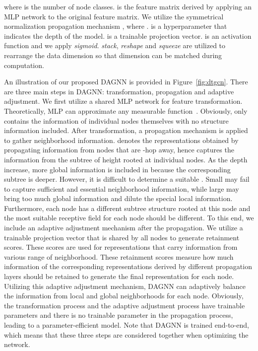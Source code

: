 \documentclass[sigconf]{acmart}
\begin{document}
where  is the number of node classes.  is the feature matrix derived by
applying an MLP network to the original feature matrix. We utilize
the symmetrical normalization propagation mechanism
,
where .
 is a hyperparameter that indicates the depth of the model.
 is a trainable
projection vector.  is an activation function and
we apply \textit{sigmoid}. \textit{stack}, \textit{reshape} and
\textit{squeeze} are utilized to rearrange the data dimension so
that dimension can be matched during computation.


An illustration of our proposed DAGNN is provided in
Figure~\ref{fig:dtgcn}. There are three main steps in DAGNN:
transformation, propagation and adaptive adjustment. We first
utilize a shared MLP network for feature transformation.
Theoretically, MLP can approximate any measurable
function~\cite{hornik1989multilayer}. Obviously, 
only contains the information of individual nodes themselves with
no structure information included. After transformation, a
propagation mechanism  is applied to
gather neighborhood information.  denotes the
representations obtained by propagating information from nodes
that are -hop away, hence  captures the
information from the subtree of height  rooted at individual
nodes. As the depth  increase, more global information is
included in  because the corresponding subtree
is deeper. However, it is difficult to determine a suitable .
Small  may fail to capture sufficient and essential
neighborhood information, while large  may bring too much
global information and dilute the special local information.
Furthermore, each node has a different subtree structure rooted
at this node and the most suitable receptive field for each node
should be different. To this end, we include an adaptive
adjustment mechanism after the propagation. We utilize a
trainable projection vector   that is shared by
all nodes to generate retainment scores. These scores are used
for representations that carry information from various range of
neighborhood. These retainment scores measure how much
information of the corresponding representations derived by
different propagation layers should be retained to generate the
final representation for each node. Utilizing this adaptive adjustment mechanism, DAGNN can adaptively balance the information from local and global neighborhoods for each node. Obviously, the transformation
process and the adaptive adjustment process have trainable
parameters and there is no trainable parameter in the propagation
process, leading to a parameter-efficient model. Note that DAGNN
is trained end-to-end, which means that these three steps are
considered together when optimizing the network.
\end{document}

